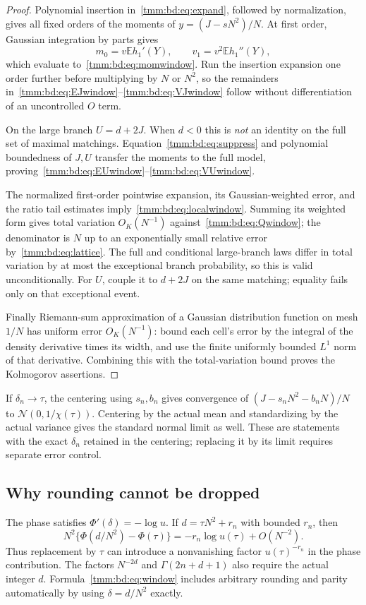 \documentclass[11pt,letterpaper]{article}
\theoremstyle{remark}\newtheorem{remark}[theorem]{Remark}
\newcommand{\E}{\mathbb E}\newcommand{\Pp}{\mathbb P}
\newcommand{\Normal}{\mathcal N}
\begin{document}
\begin{proof}
Polynomial insertion in~\eqref{tmm:bd:eq:expand}, followed by normalization, gives all fixed orders of the moments of $y=(J-sN^2)/N$. At first order, Gaussian integration by parts gives
\[
 m_0=v\E h_1'(Y),\qquad v_1=v^2\E h_1''(Y),
\]
which evaluate to~\eqref{tmm:bd:eq:momwindow}. Run the insertion expansion one order further before multiplying by $N$ or $N^2$, so the remainders in~\eqref{tmm:bd:eq:EJwindow}--\eqref{tmm:bd:eq:VJwindow} follow without differentiation of an uncontrolled $O$ term.

On the large branch $U=d+2J$. When $d<0$ this is \emph{not} an identity on the full set of maximal matchings. Equation~\eqref{tmm:bd:eq:suppress} and polynomial boundedness of $J,U$ transfer the moments to the full model, proving~\eqref{tmm:bd:eq:EUwindow}--\eqref{tmm:bd:eq:VUwindow}.

The normalized first-order pointwise expansion, its Gaussian-weighted error, and the ratio tail estimates imply~\eqref{tmm:bd:eq:localwindow}. Summing its weighted form gives total variation $O_K(N^{-1})$ against~\eqref{tmm:bd:eq:Qwindow}; the denominator is $N$ up to an exponentially small relative error by~\eqref{tmm:bd:eq:lattice}. The full and conditional large-branch laws differ in total variation by at most the exceptional branch probability, so this is valid unconditionally. For $U$, couple it to $d+2J$ on the same matching; equality fails only on that exceptional event.

Finally Riemann-sum approximation of a Gaussian distribution function on mesh $1/N$ has uniform error $O_K(N^{-1})$: bound each cell's error by the integral of the density derivative times its width, and use the finite uniformly bounded $L^1$ norm of that derivative. Combining this with the total-variation bound proves the Kolmogorov assertions.
\end{proof}

If $\delta_n\to\tau$, the centering using $s_n,b_n$ gives convergence of $(J-s_nN^2-b_nN)/N$ to $\Normal(0,1/\chi(\tau))$. Centering by the actual mean and standardizing by the actual variance gives the standard normal limit as well. These are statements with the exact $\delta_n$ retained in the centering; replacing it by its limit requires separate error control.

\subsection{Why rounding cannot be dropped}
The phase satisfies $\Phi'(\delta)=-\log u$. If $d=\tau N^2+r_n$ with bounded $r_n$, then
\[
 N^2\{\Phi(d/N^2)-\Phi(\tau)\}=-r_n\log u(\tau)+O(N^{-2}).
\]
Thus replacement by $\tau$ can introduce a nonvanishing factor $u(\tau)^{-r_n}$ in the phase contribution. The factors $N^{-2d}$ and $\Gamma(2n+d+1)$ also require the actual integer $d$. Formula~\eqref{tmm:bd:eq:window} includes arbitrary rounding and parity automatically by using $\delta=d/N^2$ exactly.
\end{document}
